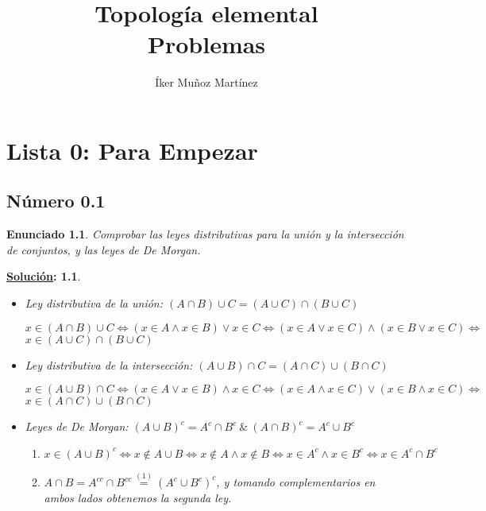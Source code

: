 \documentclass[10pt,a4paper,openright]{book}
\title{Topología elemental \\ Problemas}
\author{Íker Muñoz Martínez}
\date{}
\theoremstyle{break}
\newtheorem*{enun}{Enunciado}
\newtheorem*{sol}{\underline{Solución}:}
\begin{document}
\frontmatter
\maketitle
\setcounter{tocdepth}{3}%
\tableofcontents

\mainmatter
\chapter{Lista 0: Para Empezar}%
\label{cha:lista0}

\section{Número 0.1}
\begin{enun}
Comprobar las leyes distributivas para la unión y la intersección de conjuntos, y las leyes de De Morgan.
\end{enun}
\begin{sol}
\begin{itemize}
\item Ley distributiva de la unión: $(A \cap B) \cup C = (A \cup C) \cap (B \cup C)$

$x \in (A \cap B) \cup C \Leftrightarrow (x \in A \wedge x \in B) \vee x \in C \Leftrightarrow (x \in A \vee x \in C) \wedge (x \in B \vee x \in C) \Leftrightarrow$ $x \in (A \cup C) \cap (B \cup C)$
\item Ley distributiva de la intersección: $(A \cup B) \cap C = (A \cap C) \cup (B \cap C)$

$x \in (A \cup B) \cap C \Leftrightarrow (x \in A \vee x \in B) \wedge x \in C \Leftrightarrow (x \in A \wedge x \in C) \vee (x \in B \wedge x \in C) \Leftrightarrow$ $x \in (A \cap C) \cup (B \cap C)$
\item Leyes de De Morgan: $(A \cup B)^c = A^c \cap B^c \ \& \ (A \cap B)^c = A^c \cup B^c$
\begin{enumerate}[label={(\arabic*)}]
\item $x \in (A \cup B)^c \Leftrightarrow x \notin A \cup B \Leftrightarrow x \notin A \wedge x \notin B \Leftrightarrow x \in A^c \wedge x \in B^c \Leftrightarrow x \in A^c \cap B^c$
\item $A \cap B = A^{cc} \cap B^{cc} \overset{(1)}{=} (A^c \cup B^c)^c$, y tomando complementarios en ambos lados obtenemos la segunda ley.
\end{enumerate}
\end{itemize}
\end{sol}
\end{document}
